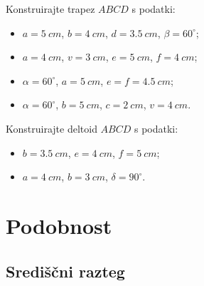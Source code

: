             \begin{naloga}
                Konstruirajte trapez $ABCD$ s podatki:
                \begin{itemize}
                    \item $a=5~cm$, $b=4~cm$, $d=3.5~cm$, $\beta=60^\circ$;
                    \item $a=4~cm$, $v=3~cm$, $e=5~cm$, $f=4~cm$;
                    \item $\alpha=60^\circ$, $a=5~cm$, $e=f=4.5~cm$;
                    \item $\alpha=60^\circ$, $b=5~cm$, $c=2~cm$, $v=4~cm$.
                \end{itemize}
            \end{naloga}

        


        
            \begin{naloga}
                Konstruirajte deltoid $ABCD$ s podatki:
                \begin{itemize}
                    \item $b=3.5~cm$, $e=4~cm$, $f=5~cm$;
                    \item $a=4~cm$, $b=3~cm$, $\delta=90^\circ$.
                \end{itemize}
            \end{naloga}

                
        

\newpage

    \section{Podobnost}

        
            \subsection*{Središčni razteg}

